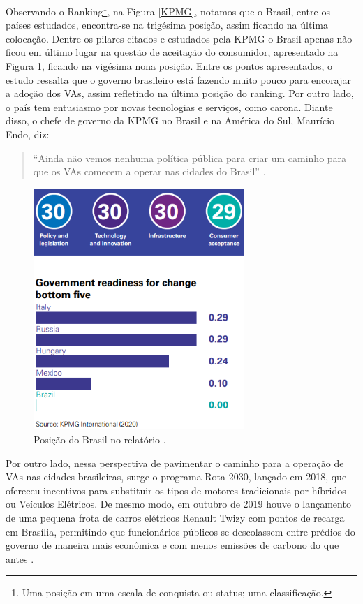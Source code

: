 Observando o Ranking\footnote{Uma posição em uma escala de conquista ou status; uma classificação.}, na Figura \ref{KPMG}, notamos que o Brasil, entre os países estudados, encontra-se na trigésima posição, assim ficando na última colocação. Dentre os pilares citados e estudados pela KPMG o Brasil apenas não ficou em último lugar na questão de aceitação do consumidor, apresentado na Figura \ref{rank30}, ficando na vigésima nona posição.
Entre os pontos apresentados, o estudo ressalta que o governo brasileiro está fazendo muito pouco para encorajar a adoção dos VAs, assim refletindo na última posição do ranking. Por outro lado, o país tem entusiasmo por novas tecnologias e serviços, como carona. Diante disso, o chefe de governo da KPMG no Brasil e na América do Sul, Maurício Endo, diz:
\begin{quote}
“Ainda não vemos nenhuma política pública para criar um caminho para que os VAs comecem a operar nas cidades do Brasil” \cite{KPMG}.
\end{quote}
\begin{figure}[H]
\centering
\includegraphics[width=8cm]{Figures/rank30.png}
\caption{Posição do Brasil no relatório \cite{KPMG}.}
\label{rank30}
\end{figure}

Por outro lado, nessa perspectiva de pavimentar o caminho para a operação de VAs nas cidades brasileiras, surge o programa Rota 2030, lançado em 2018, que ofereceu incentivos para substituir os tipos de motores tradicionais por híbridos ou Veículos Elétricos. De mesmo modo, em outubro de 2019 houve o lançamento de uma pequena frota de carros elétricos Renault Twizy com pontos de recarga em Brasília, permitindo que funcionários públicos se descolassem entre prédios do governo de maneira mais econômica e com menos emissões de carbono do que antes \cite{KPMG}.

